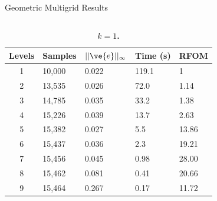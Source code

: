 \documentclass{beamer}
\begin{document}
\begin{frame}{Geometric Multigrid Results}

  \begin{columns}

    \begin{column}{0.5\textwidth}

      { \tiny
        \begin{table}[h!]
          \begin{center}
            \begin{tabular}{cllll}\hline\hline
              \multicolumn{1}{c}{\textbf{Levels}} & 
              \multicolumn{1}{l}{\textbf{Samples}} & 
              \multicolumn{1}{l}{\textbf{$||\ve{e}||_{\infty}$}} & 
              \multicolumn{1}{l}{\textbf{Time (s)}} & 
              \multicolumn{1}{l}{\textbf{RFOM}} \\
              \hline
              1 & 10,000 & 0.022 & 119.1 & 1 \\
              2 & 13,535 & 0.026 & 72.0 & 1.14 \\
              3 & 14,785 & 0.035 & 33.2 & 1.38 \\
              4 & 15,226 & 0.039 & 13.7 & 2.63 \\
              5 & 15,382 & 0.027 & 5.5 & 13.86 \\
              6 & 15,437 & 0.036 & 2.3 & 19.21 \\
              7 & 15,456 & 0.045 & 0.98 & 28.00 \\
              8 & 15,462 & 0.081 & 0.41 & 20.66 \\
              9 & 15,464 & 0.267 & 0.17 & 11.72 \\
              \hline\hline
            \end{tabular}
          \end{center}
          \caption{\textbf{$k = 1$.}}
          \label{tab:k1_results}
        \end{table}
      }

      \vspace{-0.25in}


\end{column}
\end{columns}
\end{frame}
\end{document}
